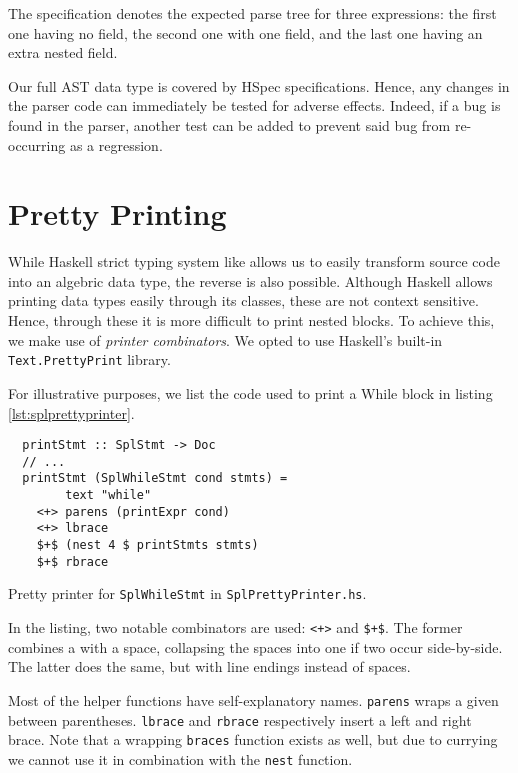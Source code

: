 The specification denotes the expected parse tree for three expressions: the first one having no field, the second one with one field, and the last one having an extra nested field.

Our full AST data type is covered by HSpec specifications.
Hence, any changes in the parser code can immediately be tested for adverse effects.
Indeed, if a bug is found in the parser, another test can be added to prevent said bug from re-occurring as a regression.

\section{Pretty Printing}

While Haskell strict typing system like allows us to easily transform source code into an algebric data type, the reverse is also possible.
Although Haskell allows printing data types easily through its  classes, these are not context sensitive.
Hence, through these it is more difficult to print nested blocks.
To achieve this, we make use of \emph{printer combinators}.
We opted to use Haskell's built-in \texttt{Text.PrettyPrint} library.

For illustrative purposes, we list the code used to print a \textsf{While} block in listing \ref{lst:splprettyprinter}.

\begin{listing}
\begin{framed}
\begin{verbatim}
  printStmt :: SplStmt -> Doc
  // ...
  printStmt (SplWhileStmt cond stmts) =
        text "while"
    <+> parens (printExpr cond)
    <+> lbrace
    $+$ (nest 4 $ printStmts stmts)
    $+$ rbrace
\end{verbatim}
\end{framed}
\caption{Pretty printer for \texttt{SplWhileStmt} in \texttt{SplPrettyPrinter.hs}.}
\label{lst:splprettyprinter}
\end{listing}

In the listing, two notable combinators are used: \texttt{<+>} and \texttt{\$+\$}. The former combines a  with a space, collapsing the spaces into one if two occur side-by-side. The latter does the same, but with line endings instead of spaces.

Most of the helper functions have self-explanatory names.
\texttt{parens} wraps a given  between parentheses.
\texttt{lbrace} and \texttt{rbrace} respectively insert a left and right brace.
Note that a wrapping \texttt{braces} function exists as well, but due to currying we cannot use it in combination with the \texttt{nest} function.

